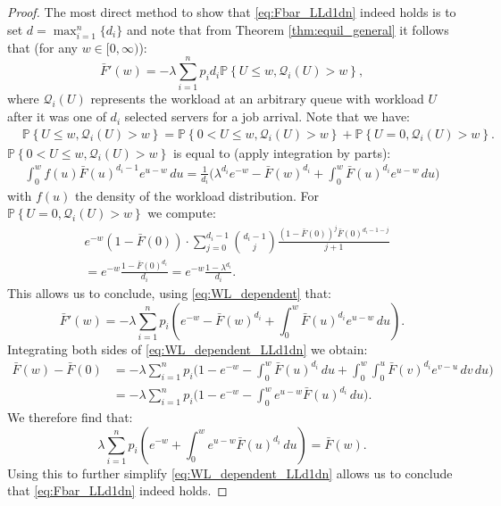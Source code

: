 \documentclass[12pt]{report}
\renewcommand{\P}{\mathbb{P}}
\renewcommand{\P}{\mathbb{P}}
\begin{document}
\begin{proof}
The most direct method to show that \eqref{eq:Fbar_LLd1dn} indeed holds is to set $d=\max_{i=1}^n\{d_i\}$ and note that from Theorem \ref{thm:equil_general} it follows that (for any $w \in [0,\infty)$):
\begin{equation} \label{eq:WL_dependent}
\bar F'(w)=-\lambda \sum_{i=1}^n p_i d_i \P\left\{U \leq w, \mathcal{Q}_i(U) > w \right\},
\end{equation}
where $\mathcal{Q}_i(U)$ represents the workload at an arbitrary queue with workload $U$ after it was one of $d_i$ selected servers for a job arrival. Note that we have:
\begin{align*}
&\P\left\{U \leq w, \mathcal{Q}_i(U) > w \right\}
=\P\left\{0<U \leq w, \mathcal{Q}_i(U) > w \right\} + \P\left\{U =0, \mathcal{Q}_i(U) > w \right\}.
\end{align*}
$\P\left\{0<U \leq w, \mathcal{Q}_i(U) > w \right\}$ is equal to (apply integration by parts):
\begin{align*}
\int_0^w f(u) \bar F(u)^{d_i-1} e^{u-w} \, du 
= \frac{1}{d_i} \bigg( \lambda ^{d_i} e^{-w} - \bar F(w)^{d_i} + \int_0^w \bar F(u)^{d_i} e^{u-w} \, du \bigg)
\end{align*}
with $f(u)$ the density of the workload distribution. For $\P\left\{U =0, \mathcal{Q}_i(U) > w \right\}$ we compute:
\begin{align*}
&e^{-w} (1-\bar F(0)) \cdot \sum_{j=0}^{d_i-1} \binom{d_i-1}{j} \frac{(1-\bar F(0))^j \bar F(0)^{d_i-1-j}}{j+1}\\
&= e^{-w} \frac{1-\bar F(0)^{d_i}}{d_i} = e^{-w} \frac{1-\lambda^{d_i}}{d_i}.
\end{align*}
This allows us to conclude, using \eqref{eq:WL_dependent} that:
\begin{equation}
\bar F'(w)
=
-\lambda \sum_{i=1}^n p_i \left( e^{-w} - \bar F(w)^{d_i} + \int_0^w \bar F(u)^{d_i} e^{u-w} \, du \right).\label{eq:WL_dependent_LLd1dn}
\end{equation}
Integrating both sides of \eqref{eq:WL_dependent_LLd1dn} we obtain:
\begin{align*}
\bar F(w) - \bar F(0)
&= -\lambda \sum_{i=1}^n p_i \bigg( 1-e^{-w}-\int_0^w \bar F(u)^{d_i} \, du
+ \int_0^w \int_0^u \bar F(v)^{d_i} e^{v-u} \, dv \, du \bigg)\\
&= - \lambda \sum_{i=1}^n p_i \bigg( 1-e^{-w} - \int_0^w e^{u-w} \bar F(u)^{d_i} \, du \bigg).
\end{align*}
We therefore find that:
$$
\lambda \sum_{i=1}^n p_i \left( e^{-w} + \int_0^w e^{u-w} \bar F(u)^{d_i} \, du \right) = \bar F(w).
$$
Using this to further simplify \eqref{eq:WL_dependent_LLd1dn} allows us to conclude that \eqref{eq:Fbar_LLd1dn} indeed holds.
\end{proof}
\end{document}
